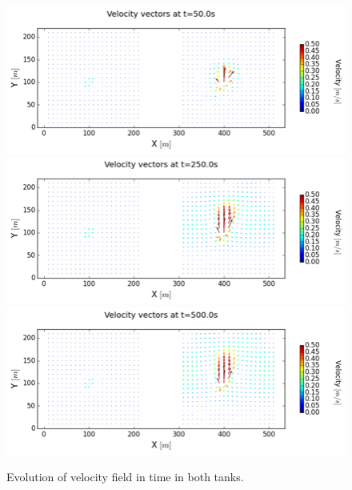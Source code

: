 \begin{figure}
\centering
\includegraphics{img/image98}
\includegraphics{img/image99}
\includegraphics{img/image100}
 \caption{Evolution of velocity field in time in both tanks.}\label{fig:siphon:evol_vel}
\end{figure}
